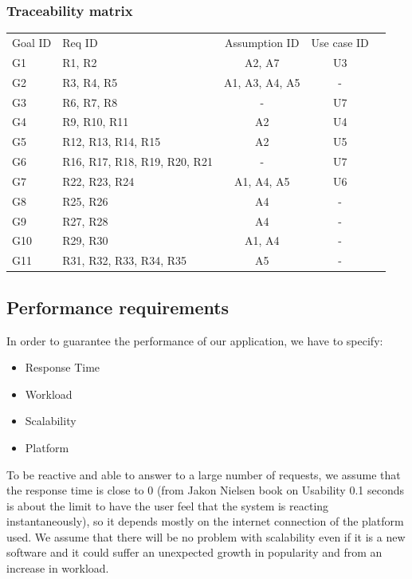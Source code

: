 \documentclass[12pt,titlepage]{article}
\begin{document}
 \subsubsection{Traceability matrix}
\begin{tabular}{llccr}
\rowcolor{red}
Goal ID & Req ID & Assumption ID & Use case ID \\
\rowcolor{lightgray}
 G1 &R1, R2 & A2, A7 &  U3 \\
\rowcolor{anti-flashwhite}
G2 & R3, R4, R5 & A1, A3, A4, A5& -\\
\rowcolor{lightgray}
G3 & R6, R7, R8 & - & U7 \\
\rowcolor{anti-flashwhite}
G4 & R9, R10, R11 & A2 & U4 \\
\rowcolor{lightgray}
G5 & R12, R13, R14, R15 & A2& U5 \\
\rowcolor{anti-flashwhite}
G6 & R16, R17, R18, R19, R20, R21 & - &  U7 \\
\rowcolor{lightgray}
G7 & R22, R23, R24 &A1, A4, A5& U6 \\
\rowcolor{anti-flashwhite}
G8 & R25, R26 & A4& - \\
\rowcolor{lightgray}
G9 & R27, R28 & A4& - \\
\rowcolor{anti-flashwhite}
G10 & R29, R30& A1, A4& - \\
\rowcolor{lightgray}
G11 & R31, R32, R33, R34, R35 & A5&- 
\end{tabular}

\subsection{Performance requirements}\label{sec:mod1}
In order to guarantee the performance of our application, we have to specify:
\begin{itemize}
\item Response Time 
\item Workload
\item Scalability
\item Platform
\end{itemize}
To be reactive and able to answer to a large number of requests, we assume that the response time is close to 0 (from Jakon Nielsen book on Usability 0.1 seconds is about the limit to have the user feel that the system is reacting instantaneously), so it depends mostly on the internet connection of the platform used. 
We assume that there will be no problem with scalability even if it is a new software and it could suffer an unexpected growth in popularity and from an increase in workload.
\end{document}
